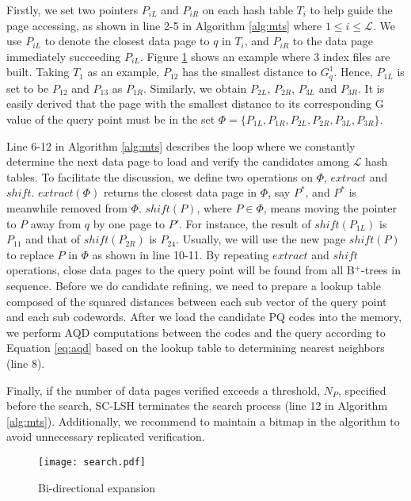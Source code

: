 \documentclass[twocolumn]{svjour3}          %
\begin{document}
Firstly, we set two pointers $P_{iL}$ and $P_{iR}$ on each hash table $T_i$ to help guide the page accessing, as shown in line 2-5 in Algorithm \ref{alg:mts} where $1\leq i \leq \mathcal{L}$. We use $P_{iL}$ to denote the closest data page to $q$ in $T_i$, and $P_{iR}$ to the data page immediately succeeding $P_{iL}$. Figure \ref{fig:search} shows an example where 3 index files are built.
Taking $T_1$ as an example, $P_{12}$ has the smallest distance to $G_{q}^1$. Hence, $P_{1L}$ is set to be $P_{12}$ and $P_{13}$ as $P_{1R}$. Similarly, we obtain $P_{2L}$, $P_{2R}$, $P_{3L}$ and $P_{3R}$. It is easily derived that the page with the smallest distance to its corresponding G value of the query point must be in the set $\Phi=\{P_{1L}, P_{1R}, P_{2L}, P_{2R}, P_{3L}, P_{3R} \}$.

Line 6-12 in Algorithm \ref{alg:mts} describes the loop where we constantly determine the next data page to load and verify the candidates among $\mathcal{L}$ hash tables. To facilitate the discussion, we define two operations on $\Phi$, $extract$ and $shift$. $extract(\Phi)$ returns the closest data page in $\Phi$, say $P^*$, and $P^*$ is meanwhile removed from $\Phi$. $shift(P)$, where $P \in \Phi$, means moving the pointer to $P$ away from $q$ by one page to $P'$. For instance, the result of $shift(P_{1L})$ is $P_{11}$ and that of $shift(P_{2R})$ is $P_{24}$. Usually, we will use the new page $shift(P)$ to replace $P$ in $\Phi$ as shown in line 10-11. By repeating $extract$ and $shift$ operations, close data pages to the query point will be found from all B$^+$-trees in sequence.
Before we do candidate refining, we need to prepare a lookup table composed of the squared distances between each sub vector of the query point and each sub codewords. After we load the candidate PQ codes into the memory, we perform AQD computations between the codes and the query according to Equation \ref{eq:aqd} based on the lookup table to determining nearest neighbors (line 8).

Finally, if the number of data pages verified exceeds a threshold, $N_P$, specified before the search, SC-LSH terminates the search process (line 12 in Algorithm \ref{alg:mts}). Additionally, we recommend to maintain a bitmap in the algorithm to avoid unnecessary replicated verification.
\begin{figure}[t]
	\begin{center}
		{
			\texttt{[image: search.pdf]}
		}
	\end{center}
	\caption{Bi-directional expansion}
	\label{fig:search}
\end{figure}
\end{document}
